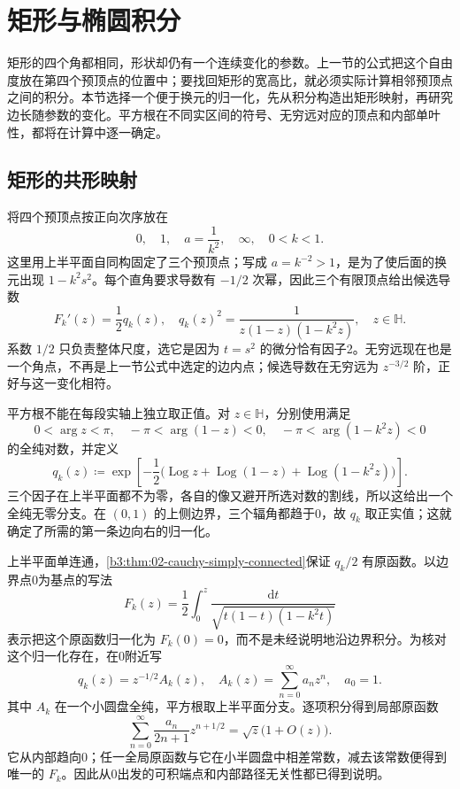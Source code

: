 \section{矩形与椭圆积分}
\label{b3:sec:0704}

矩形的四个角都相同，形状却仍有一个连续变化的参数。上一节的公式把这个自由度放在第四个预顶点的位置中；要找回矩形的宽高比，就必须实际计算相邻预顶点之间的积分。本节选择一个便于换元的归一化，先从积分构造出矩形映射，再研究边长随参数的变化。平方根在不同实区间的符号、无穷远对应的顶点和内部单叶性，都将在计算中逐一确定。

\subsection{矩形的共形映射}
\label{b3:subsec:070401}

将四个预顶点按正向次序放在
\[
 0,\quad 1,\quad a=\frac1{k^2},\quad\infty,
 \quad 0<k<1.
\]
这里用上半平面自同构固定了三个预顶点；写成 \(a=k^{-2}>1\)，是为了使后面的换元出现 \(1-k^2s^2\)。每个直角要求导数有 \(-1/2\) 次幂，因此三个有限顶点给出候选导数
\[
 F_k'(z)=\frac12q_k(z),\quad
 q_k(z)^2=\frac1{z(1-z)(1-k^2z)},\quad z\in\mathbb H.
\]
系数 \(1/2\) 只负责整体尺度，选它是因为 \(t=s^2\) 的微分恰有因子2。无穷远现在也是一个角点，不再是上一节公式中选定的边内点；候选导数在无穷远为 \(z^{-3/2}\) 阶，正好与这一变化相符。

\ProseParagraphBreak

平方根不能在每段实轴上独立取正值。对 \(z\in\mathbb H\)，分别使用满足
\[
 0<\arg z<\pi,\quad
 -\pi<\arg(1-z)<0,\quad
 -\pi<\arg(1-k^2z)<0
\]
的全纯对数，并定义
\[
 q_k(z)\coloneqq
 \exp\left[-\frac12\bigl(
 \operatorname{Log}z+\operatorname{Log}(1-z)
 +\operatorname{Log}(1-k^2z)\bigr)\right].
\]
三个因子在上半平面都不为零，各自的像又避开所选对数的割线，所以这给出一个全纯无零分支。在 \((0,1)\) 的上侧边界，三个辐角都趋于0，故 \(q_k\) 取正实值；这就确定了所需的第一条边向右的归一化。

\ProseParagraphBreak

上半平面单连通，\cref{b3:thm:02-cauchy-simply-connected}保证 \(q_k/2\) 有原函数。以边界点0为基点的写法
\[
 F_k(z)=\frac12\int_0^z
 \frac{\mathrm{d}t}{\sqrt{t(1-t)(1-k^2t)}}
\]
表示把这个原函数归一化为 \(F_k(0)=0\)，而不是未经说明地沿边界积分。为核对这个归一化存在，在0附近写
\[
 q_k(z)=z^{-1/2}A_k(z),\quad
 A_k(z)=\sum_{n=0}^{\infty}a_nz^n,\quad a_0=1.
\]
其中 \(A_k\) 在一个小圆盘全纯，平方根取上半平面分支。逐项积分得到局部原函数
\[
 \sum_{n=0}^{\infty}\frac{a_n}{2n+1}z^{n+1/2}
 =\sqrt z\bigl(1+O(z)\bigr).
\]
它从内部趋向0；任一全局原函数与它在小半圆盘中相差常数，减去该常数便得到唯一的 \(F_k\)。因此从0出发的可积端点和内部路径无关性都已得到说明。

